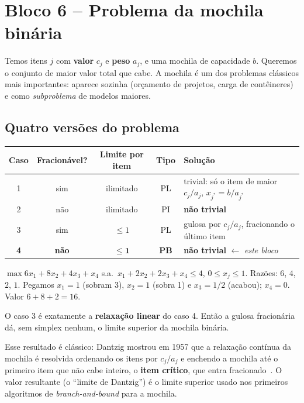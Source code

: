 \chapter{Bloco 6 -- Problema da mochila binária}
\label{cap:bloco6}

Temos itens $j$ com \textbf{valor} $c_j$ e \textbf{peso} $a_j$, e uma mochila de capacidade $b$. Queremos o conjunto
de maior valor total que cabe. A mochila é um dos problemas clássicos mais importantes: aparece sozinha (orçamento
de projetos, carga de contêineres) e como \emph{subproblema} de modelos maiores.

\section{Quatro versões do problema}

\begin{center}
\begin{tabular}{ccccl}
\toprule
Caso & Fracionável? & Limite por item & Tipo & Solução\\
\midrule
1 & sim & ilimitado & PL & trivial: só o item de maior $c_j/a_j$, $x_{j^*}=b/a_{j^*}$\\
2 & não & ilimitado & PI & \textbf{não trivial}\\
3 & sim & $\le1$ & PL & gulosa por $c_j/a_j$, fracionando o último item\\
\textbf{4} & \textbf{não} & $\le\mathbf{1}$ & \textbf{PB} & \textbf{não trivial} $\leftarrow$ \emph{este bloco}\\
\bottomrule
\end{tabular}
\end{center}

\begin{exemplo}
$\max 6x_1+8x_2+4x_3+x_4$ s.a.\ $x_1+2x_2+2x_3+x_4\le4$, $0\le x_j\le1$. Razões: $6$, $4$, $2$, $1$.
Pegamos $x_1=1$ (sobram 3), $x_2=1$ (sobra 1) e $x_3=1/2$ (acabou); $x_4=0$. Valor $6+8+2=16$.
\end{exemplo}

O caso 3 é exatamente a \textbf{relaxação linear} do caso 4. Então a gulosa fracionária dá, sem simplex nenhum, o
limite superior da mochila binária.

\begin{outros}
Esse resultado é clássico: Dantzig mostrou em 1957 que a relaxação contínua da mochila é resolvida ordenando os itens
por $c_j/a_j$ e enchendo a mochila até o primeiro item que não cabe inteiro, o \textbf{item crítico}, que entra
fracionado~\cite{dantzig1957,martellototh1990}. O valor resultante (o ``limite de Dantzig'') é o limite superior
usado nos primeiros algoritmos de \emph{branch-and-bound} para a mochila.
\end{outros}

